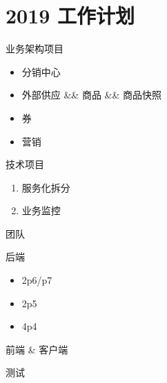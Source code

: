 \documentclass[presentation, bigger]{beamer}
\begin{document}
\section{2019 工作计划}
\label{sec:org8ddac9b}
\begin{frame}[label={sec:org5b087a2}]{业务架构项目}
\begin{itemize}
\item 分销中心
\item 外部供应 \&\& 商品 \&\& 商品快照
\item 券
\item 营销
\end{itemize}
\end{frame}
\begin{frame}[label={sec:org532bc98}]{技术项目}
\begin{enumerate}
\item 服务化拆分
\item 业务监控
\end{enumerate}
\end{frame}
\begin{frame}[label={sec:org516bc3b}]{团队}
\begin{block}{后端}
\begin{itemize}
\item 2p6/p7
\item 2p5
\item 4p4
\end{itemize}
\end{block}
\begin{block}{前端 \& 客户端}
\end{block}
\begin{block}{测试}
\end{block}
\end{frame}
\end{document}
